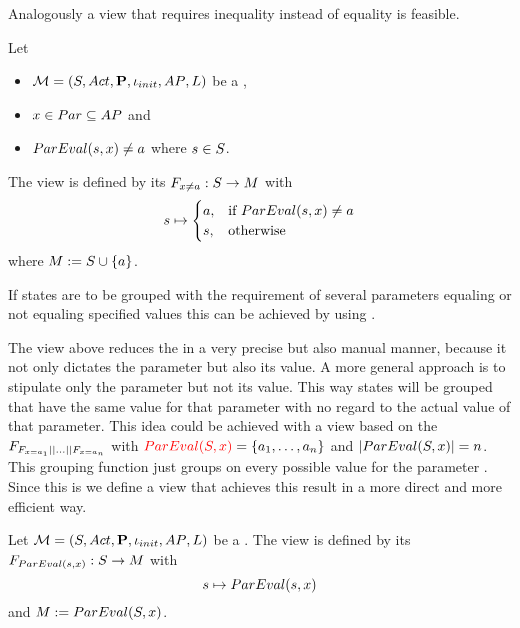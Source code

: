 \documentclass[preview]{standalone}
\begin{document}
Analogously a view that requires inequality instead of equality is feasible.

\begin{definition}
	Let
	\begin{itemize}
		\item ${{{\mathcal{M}}}} = {{({S}, {Act}, {\textbf{P}}, {\iota_{init}}, {AP}, {L})}}$ be a \chosengraphtypeN,
		\item ${x} \in {Par} \subseteq {AP}$ and 
		\item ${ParEval}({s}, {x}) \neq {a}$ where ${s} \in {S}$.		
	\end{itemize} 
	The view \viewparamvaluesneq is defined by its \grpfctN ${{{F}}_{{x} \neq {a}}} : {S} \to {\ensuremath{{M}}}$ with
	\[
	{s} \mapsto
	\begin{cases}
		{a}, &\text{if } {ParEval}({s}, {x}) \neq {a}\\
		{s}, 	&\text{otherwise}
	\end{cases}
	\]
	where ${{M}} := {S} \cup \{a\}$.
\end{definition}

If states are to be grouped with the requirement of several parameters equaling or not equaling specified values this can be achieved by using \parllcompN. 

The view above reduces the \chosengraphtypeN in a very precise but also manual manner, because it not only dictates the parameter but also its value. A more general approach is to stipulate only the parameter but not its value. This way states will be grouped that have the same value for that parameter with no regard to the actual value of that parameter. This idea could be achieved with a view based on the \grpfctN $\grpfct_{\gfctparamvalueseqopt[\paramval_1] \pll \dots \pll \gfctparamvalueseqopt[\paramval_n]}$ with ${\color{red}{ParEval}({S}, {x})} = \{{a}_1, \dots, {a}_n\}$ and $|{ParEval}({S},{x})| = n$. This grouping function just groups on every possible value for the parameter \param. Since this is  we define a view that achieves this result in a more direct and more efficient way.

\begin{definition}
	Let ${{{\mathcal{M}}}} = {{({S}, {Act}, {\textbf{P}}, {\iota_{init}}, {AP}, {L})}}$ be a \chosengraphtypeN. The view \viewparamvalident is defined by its \grpfctN ${{{F}}_{{ParEval}({s},{x})}} : {S} \to {\ensuremath{{M}}}$ with
	\[
	{s} \mapsto {ParEval}({s},{x})
	\]
	and ${{M}} := {ParEval}({S}, {x})$.
\end{definition}
\end{document}
